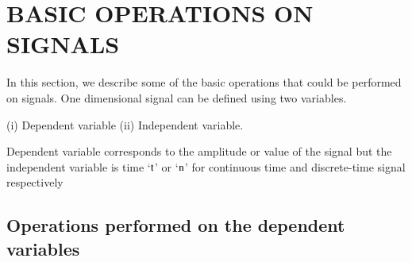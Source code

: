 \section{BASIC OPERATIONS ON SIGNALS}\label{chap1-sec-1.5}

In this section, we describe some of the basic operations that could be performed on signals. One dimensional signal can be defined using two variables.

(i) Dependent variable \qquad (ii) Independent variable.

Dependent variable corresponds to the amplitude or value of the signal but the independent variable is time `$\textrm{t}$' or
`$\textrm{n}$' for continuous time and discrete-time signal respectively

\subsection{Operations performed on the dependent variables}\label{chap1-subsec-1.5.1}
